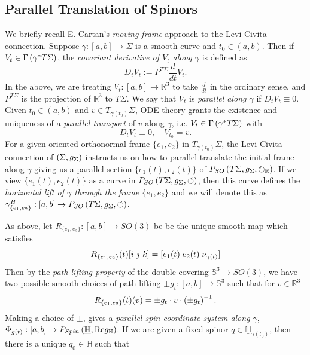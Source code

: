 \documentclass[openany, 11pt]{article}
\theoremstyle{definition}
\theoremstyle{remark}
\def\lp{\ensuremath{\left(}}
\def\rp{\ensuremath{\right)}}
\def\bH{\ensuremath{\mathbb{H}}}
\def\bR{\ensuremath{\mathbb{R}}}
\begin{document}
\subsection{Parallel Translation of Spinors}
We briefly recall E. Cartan's \emph{moving frame} approach to the Levi-Civita connection. Suppose $\gamma:[a,b]\rightarrow \Sigma$ is a smooth curve and $t_0\in(a,b)$. Then if $V_t\in\Gamma\lp \gamma^*T\Sigma\rp$, the \emph{covariant derivative of $V_t$ along $\gamma$} is defined as
\[  
    D_tV_t:=P^{T\Sigma}\frac{d}{dt}V_t.
\]
In the above, we are treating $V_t:[a,b]\rightarrow \bR^3$ to take $\frac{d}{dt}$ in the ordinary sense, and $P^{T\Sigma}$ is the projection of $\bR^3$ to $T\Sigma$. We say that $V_t$ is \emph{parallel along $\gamma$} if $D_tV_t\equiv 0$. Given $t_0\in(a,b)$ and $v\in T_{\gamma(t_0)}\Sigma$, ODE theory grants the existence and uniqueness of a \emph{parallel transport} of $v$ along $\gamma$, i.e. $V_t\in\Gamma\lp\gamma^*T\Sigma\rp$ with
\[
    D_tV_t\equiv 0,\quad V_{t_0}=v.
\]
For a given oriented orthonormal frame $\{ e_1,e_2\}$ in $T_{\gamma(t_0)}\Sigma$, the Levi-Civita connection of $\lp \Sigma,g_{\Sigma}\rp$ instructs us on how to parallel translate the initial frame along $\gamma$ giving us a parallel section $\{ e_1(t),e_2(t)\}$ of $P_{SO}\lp T\Sigma,g_{\Sigma},\circlearrowright_{\bR}\rp$. If we view $\{ e_1(t),e_2(t)\}$ as a curve in $P_{SO}\lp T\Sigma,g_{\Sigma},\circlearrowleft\rp$, then this curve defines the \emph{horizontal lift of $\gamma$ through the frame $\{ e_1,e_2\}$} and we will denote this as $\gamma^{H}_{\{e_1,e_2\}}:[a,b]\rightarrow P_{SO}\lp T\Sigma,g_{\Sigma},\circlearrowleft\rp$.\par
As above, let $R_{\{e_1,e_2\}}:[a,b]\rightarrow SO(3)$ be be the unique smooth map which satisfies
\[
    R_{\{e_1,e_2\}}(t)[i\hspace{.1cm}j\hspace{.1cm}k]=[e_1(t)\hspace{.1cm}e_2(t)\hspace{.1cm}\nu_{\gamma(t)}]
\]
Then by the \emph{path lifting property} of the double covering $\mathbb{S}^3\rightarrow SO(3)$, we have two possible smooth choices of path lifting $\pm g_t:[a,b]\rightarrow\mathbb{S}^3$ such that for $v\in\bR^3$
\[
    R_{\{ e_1,e_2\}}(t)(v)=\pm g_t\cdot v\cdot \lp\pm g_t\rp^{-1}.
\]
Making a choice of $\pm$, gives a \emph{parallel spin coordinate system along $\gamma$}, $\Phi_{g(t)}:[a,b]\rightarrow P_{Spin}\lp\underline{\bH},\text{Re}g_{\bH}\rp$. If we are given a fixed spinor $q\in\underline{\bH}_{\gamma(t_0)}$, then there is a unique $q_0\in\bH$ such that
\end{document}
